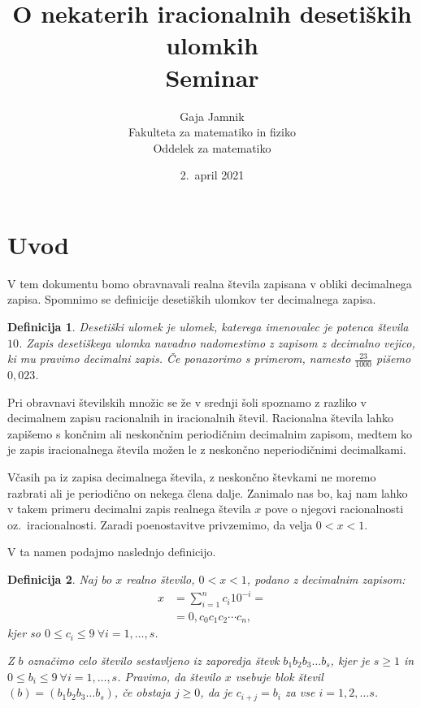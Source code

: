 \documentclass[a4paper,12pt]{article}
\title{O nekaterih iracionalnih desetiških ulomkih \\ 
\Large Seminar}
\author{Gaja Jamnik \\
Fakulteta za matematiko in fiziko \\
Oddelek za matematiko}
\date{2.\ april 2021}
\newtheorem{definicija}{Definicija}
\begin{document}


\maketitle



\section{Uvod}
V tem dokumentu bomo obravnavali realna števila zapisana v obliki decimalnega zapisa.
Spomnimo se definicije desetiških ulomkov ter decimalnega zapisa.

\begin{definicija}
    {\em Desetiški ulomek} je ulomek, katerega imenovalec je potenca števila $10$. Zapis desetiškega ulomka navadno
    nadomestimo z zapisom z decimalno vejico, ki mu pravimo {\em decimalni zapis}. Če ponazorimo s primerom, namesto 
    $ \frac{23}{1000}$ pišemo $0,023$.
\end{definicija}

Pri obravnavi številskih množic se že v srednji šoli spoznamo z razliko v decimalnem zapisu
racionalnih in iracionalnih števil. Racionalna števila lahko zapišemo
s končnim ali neskončnim periodičnim decimalnim zapisom, medtem ko je zapis iracionalnega števila možen 
le z neskončno neperiodičnimi decimalkami.

Včasih pa iz zapisa decimalnega števila, z neskončno števkami ne moremo razbrati ali je periodično on nekega člena dalje.
Zanimalo nas bo, kaj nam lahko v takem primeru decimalni zapis realnega števila $x$ pove o njegovi racionalnosti
oz.\ iracionalnosti.
Zaradi poenostavitve privzemimo, da velja $ 0 < x < 1$.

V ta namen podajmo naslednjo definicijo.

\begin{definicija}
    \label{defincija blokov}
    Naj bo $x$ realno število, $ 0 < x < 1$, podano z decimalnim zapisom: 
    \[ 
        \begin{split}
            x & = \sum^n_{i=1} c_i 10^{-i} = \\
            & = 0,c_0c_1c_2 \cdots c_n ,
        \end{split}   
    \]
    kjer so $0 \leq c_i \leq 9 \ \forall i = 1, \dots, s$.
    
    Z $b$ označimo celo število sestavljeno iz zaporedja števk
    $b_1b_2b_3 \dots b_s$, 
    kjer je $s\geq 1$ in $0 \leq b_i \leq 9 \ \forall i = 1, \dots, s$.
    Pravimo, da število $x$ {\em vsebuje blok števil $(b) = (b_1b_2b_3 \dots b_s)$}, če obstaja $j \geq 0$, da je 
    $c_{i+j} = b_i$ za vse $i=1, 2, \dots s$.
\end{definicija}
\end{document}
